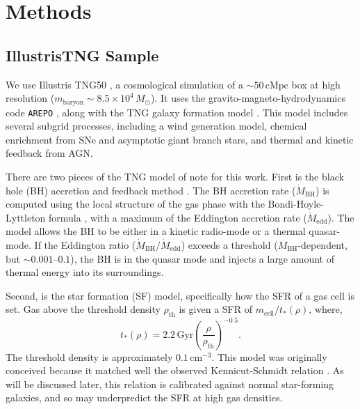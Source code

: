 \documentclass[twocolumn,linenumbers]{aastex631}
\newcommand{\Msun}{\ensuremath{M_{\odot}}}
\newcommand{\Gyr}{\ensuremath{\textrm{Gyr}}}
\begin{document}
\section{Methods}\label{sec:methods}
\subsection{IllustrisTNG Sample}\label{ssec:tng}
We use Illustris TNG50 \citep{2019MNRAS.490.3196P, 2019MNRAS.490.3234N, 2019ComAC...6....2N}, a cosmological simulation of a $\sim50\,\textrm{cMpc}$ box at high resolution ($m_{\textrm{baryon}}\sim8.5\times10^4\,\Msun$). It uses the gravito-magneto-hydrodynamics code \texttt{AREPO} \citep{2010MNRAS.401..791S, 2016MNRAS.455.1134P}, along with the TNG galaxy formation model \citep{2013MNRAS.436.3031V, 2017MNRAS.465.3291W, 2018MNRAS.473.4077P}. This model includes several subgrid processes, including a wind generation model, chemical enrichment from SNe and asymptotic giant branch stars, and thermal and kinetic feedback from AGN.

There are two pieces of the TNG model of note for this work. First is the black hole (BH) accretion and feedback method \citep{2017MNRAS.465.3291W}. The BH accretion rate ($\dot{M}_{\textrm{BH}}$) is computed using the local structure of the gas phase with the Bondi-Hoyle-Lyttleton formula \citep{1939PCPS...35..405H,1944MNRAS.104..273B,1952MNRAS.112..195B}, with a maximum of the Eddington accretion rate ($\dot{M}_{\textrm{edd}}$). The model allows the BH to be either in a kinetic radio-mode or a thermal quasar-mode. If the Eddington ratio ($\dot{M}_{\textrm{BH}}/\dot{M}_{\textrm{edd}}$) exceeds a threshold ($M_{\textrm{BH}}$-dependent, but $\sim0.001$--$0.1$), the BH is in the quasar mode and injects a large amount of thermal energy into its surroundings.

Second, is the star formation (SF) model, specifically how the SFR of a gas cell is set. Gas above the threshold density $\rho_{\textrm{th}}$ is given a SFR of $m_{\textrm{cell}}/t_{*}(\rho)$, where,
\begin{equation*}
t_{*}(\rho)=2.2\,\Gyr \left(\frac{\rho}{\rho_{\textrm{th}}}\right)^{-0.5}\textrm{.}
\end{equation*}
The threshold density is approximately $0.1\,\textrm{cm}^{-3}$. This model was originally conceived because it matched well the observed Kennicut-Schmidt relation \citep{Kennicutt1998,2003MNRAS.339..289S}. As will be discussed later, this relation is calibrated against normal star-forming galaxies, and so may underpredict the SFR at high gas densities.
\end{document}

